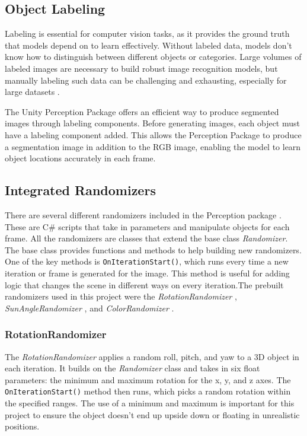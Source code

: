\subsection{Object Labeling}
Labeling is essential for computer vision tasks, as it provides the ground truth that models depend on to learn effectively. Without labeled data, models don't know how to distinguish between different objects or categories. Large volumes of labeled images are necessary to build robust image recognition models, but manually labeling such data can be challenging and exhausting, especially for large datasets \cite{10.1007/978-3-642-15549-9_55}.

The Unity Perception Package offers an efficient way to produce segmented images through labeling components. Before generating images, each object must have a labeling component added. This allows the Perception Package to produce a segmentation image in addition to the RGB image, enabling the model to learn object locations accurately in each frame.



\subsection{Integrated Randomizers}
There are several different randomizers included in the Perception package \cite{unity-perception2022}. These are C\# scripts that take in parameters and manipulate objects for each frame. All the randomizers are classes that extend the base class \textit{Randomizer}. The base class provides functions and methods to help building new randomizers. One of the key methods is \texttt{OnIterationStart()}, which runs every time a new iteration or frame is generated for the image. This method is useful for adding logic that changes the scene in different ways on every iteration.The prebuilt randomizers used in this project were the \textit{RotationRandomizer} \cite{rotation_randomizer}, \textit{SunAngleRandomizer} \cite{sun_angle_randomizer}, and \textit{ColorRandomizer} \cite{color_randomizer}. 

\subsubsection{RotationRandomizer}
The \textit{RotationRandomizer} \cite{rotation_randomizer} applies a random roll, pitch, and yaw to a 3D object in each iteration. It builds on the \textit{Randomizer} class and takes in six float parameters: the minimum and maximum rotation for the x, y, and z axes. The \texttt{OnIterationStart()} method then runs, which picks a random rotation within the specified ranges. The use of a minimum and maximum is important for this project to ensure the object doesn’t end up upside down or floating in unrealistic positions.

